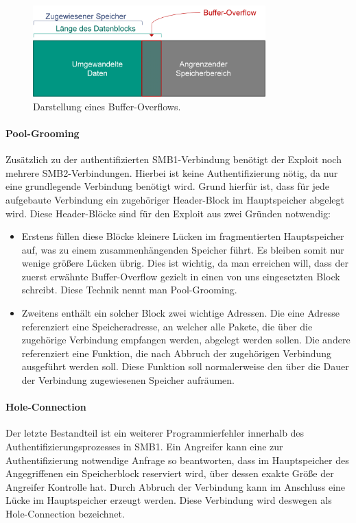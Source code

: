 \documentclass{AIFB_ITI_Crypto_Seminar}
\begin{document}
\begin{figure}
\center
  \includegraphics[width=0.8\textwidth]{Bilder/buffer-overflow.png}
  \caption{Darstellung eines Buffer-Overflows.}
  \label{img:buffer-overflow}
\end{figure}

\paragraph{Pool-Grooming}
Zusätzlich zu der authentifizierten SMB1-Verbindung benötigt der Exploit noch mehrere SMB2-Verbindungen. Hierbei ist keine Authentifizierung nötig, da nur eine grundlegende Verbindung benötigt wird. Grund hierfür ist, dass für jede aufgebaute Verbindung ein zugehöriger Header-Block im Hauptspeicher abgelegt wird. Diese Header-Blöcke sind für den Exploit aus zwei Gründen notwendig:
\begin{itemize}
\item Erstens füllen diese Blöcke kleinere Lücken im fragmentierten Hauptspeicher auf, was zu einem zusammenhängenden Speicher führt. Es bleiben somit nur wenige größere Lücken übrig. Dies ist wichtig, da man erreichen will, dass der zuerst erwähnte Buffer-Overflow gezielt in einen von uns eingesetzten Block schreibt. Diese Technik nennt man Pool-Grooming. 
\item Zweitens enthält ein solcher Block zwei wichtige Adressen. Die eine Adresse referenziert eine Speicheradresse, an welcher alle Pakete, die über die zugehörige Verbindung empfangen werden, abgelegt werden sollen. Die andere referenziert eine Funktion, die nach Abbruch der zugehörigen Verbindung ausgeführt werden soll. Diese Funktion soll normalerweise den über die Dauer der Verbindung zugewiesenen Speicher aufräumen.
\end{itemize}

\paragraph{Hole-Connection}
Der letzte Bestandteil ist ein weiterer Programmierfehler innerhalb des Authentifizierungsprozesses in SMB1. Ein Angreifer kann eine zur Authentifizierung notwendige Anfrage so beantworten, dass im Hauptspeicher des Angegriffenen ein Speicherblock reserviert wird, über dessen exakte Größe der Angreifer Kontrolle hat. Durch Abbruch der Verbindung kann im Anschluss eine Lücke im Hauptspeicher erzeugt werden. Diese Verbindung wird deswegen als Hole-Connection bezeichnet.
\end{document}
